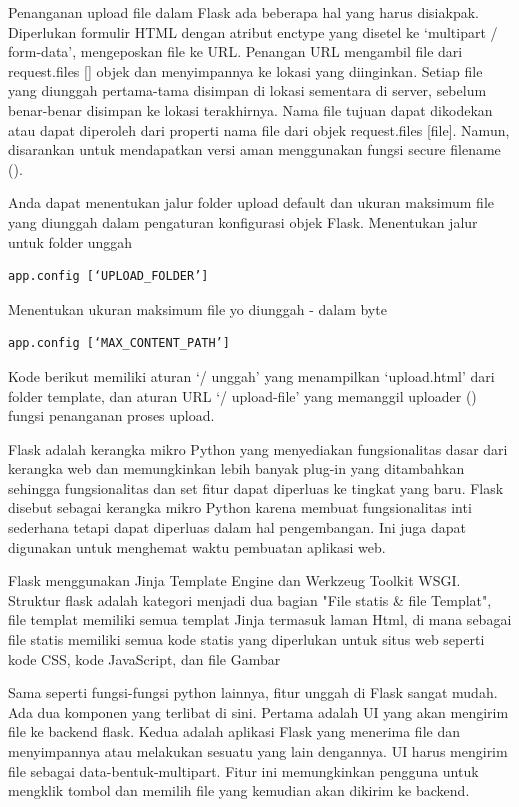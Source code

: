 Penanganan upload file dalam Flask ada beberapa hal yang harus disiakpak. Diperlukan formulir HTML dengan atribut enctype yang disetel ke ‘multipart / form-data’, mengeposkan file ke URL. Penangan URL mengambil file dari request.files [] objek dan menyimpannya ke lokasi yang diinginkan.
Setiap file yang diunggah pertama-tama disimpan di lokasi sementara di server, sebelum benar-benar disimpan ke lokasi terakhirnya. Nama file tujuan dapat dikodekan atau dapat diperoleh dari properti nama file dari objek request.files [file]. Namun, disarankan untuk mendapatkan versi aman menggunakan fungsi secure filename ().

Anda dapat menentukan jalur folder upload default dan ukuran maksimum file yang diunggah dalam pengaturan konfigurasi objek Flask.
Menentukan jalur untuk folder unggah
\begin{verbatim}
app.config [‘UPLOAD_FOLDER’] 
\end{verbatim}
Menentukan ukuran maksimum file yo diunggah - dalam byte
\begin{verbatim}
app.config [‘MAX_CONTENT_PATH’] 
\end{verbatim}
Kode berikut memiliki aturan ‘/ unggah’ yang menampilkan ‘upload.html’ dari folder template, dan aturan URL ‘/ upload-file’ yang memanggil uploader () fungsi penanganan proses upload.

Flask adalah kerangka mikro Python yang menyediakan fungsionalitas dasar dari kerangka web dan memungkinkan lebih banyak plug-in yang ditambahkan sehingga fungsionalitas dan set fitur dapat diperluas ke tingkat yang baru. Flask disebut sebagai kerangka mikro Python karena membuat fungsionalitas inti sederhana tetapi dapat diperluas dalam hal pengembangan. Ini juga dapat digunakan untuk menghemat waktu pembuatan aplikasi web.

 Flask menggunakan Jinja Template Engine dan Werkzeug Toolkit WSGI. Struktur flask adalah kategori menjadi dua bagian "File statis \& file Templat", file templat memiliki semua templat Jinja termasuk laman Html, di mana sebagai file statis memiliki semua kode statis yang diperlukan untuk situs web seperti kode CSS, kode JavaScript, dan file Gambar

Sama seperti fungsi-fungsi python lainnya, fitur unggah di Flask sangat mudah. Ada dua komponen yang terlibat di sini. Pertama adalah UI yang akan mengirim file ke backend flask. Kedua adalah aplikasi Flask yang menerima file dan menyimpannya atau melakukan sesuatu yang lain dengannya. UI harus mengirim file sebagai data-bentuk-multipart. Fitur ini memungkinkan pengguna untuk mengklik tombol dan memilih file yang kemudian akan dikirim ke backend.

